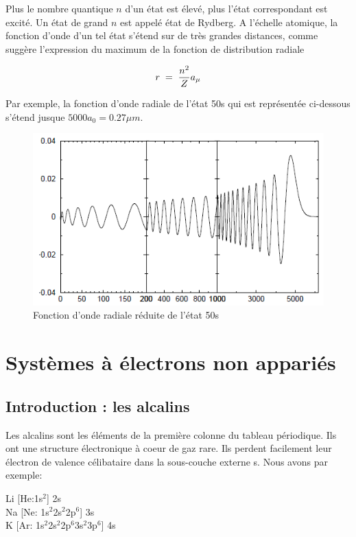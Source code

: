 Plus le nombre quantique $n$ d'un état est élevé, plus l'état correspondant est excité. Un état de grand $n$ est appelé état de Rydberg. A l'échelle atomique, la fonction d'onde d'un tel état s'étend sur de très grandes distances, comme suggère l'expression du maximum de la fonction de distribution radiale

\[
    r\; = \; \dfrac{n^2}{Z}a_{\mu}
\]

Par exemple, la fonction d'onde radiale de l'état 50s qui est représentée ci-dessous s'étend jusque $5000a_0=0.27\mu m$.

\begin{figure}[tph]
    \centering
    \includegraphics{Images2/50s.PNG}
    \caption{Fonction d'onde radiale réduite de l'état 50s}
\end{figure}





\newpage

\section{Systèmes à électrons non appariés}
\subsection{Introduction : les alcalins}

Les alcalins sont les éléments de la première colonne du tableau périodique. Ils ont une structure électronique à coeur de gaz rare. Ils perdent facilement leur électron de valence célibataire dans la sous-couche externe s. Nous avons par exemple:




\begin{center}

Li [He:1s$^{2}$] 2s \\
Na [Ne: 1s$^{2}$2s$^{2}$2p$^{6}$] 3s \\
K [Ar: 1s$^{2}$2s$^{2}$2p$^{6}$3s$^{2}$3p$^{6}$] 4s 

\end{center}




